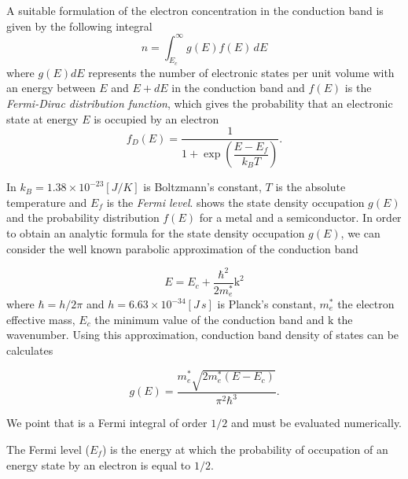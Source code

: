 A suitable formulation of the electron concentration in the conduction band is given by the following integral
\begin{equation}
\label{eq: carrier densiy integral}
n = \int_{E_c}^\infty g(E)f(E) \, dE
\end{equation}
where $g(E)dE$ represents the number of electronic states per unit volume with an energy between $E$ and $E+dE$ in the conduction band and $f(E)$ is the \textit{Fermi-Dirac distribution function}, which gives the probability that an electronic state at energy $E$ is occupied by an electron
\begin{equation}
\label{eq: fermi dirac distribution}
f_D(E) = \dfrac{1}{1+\exp\left(\dfrac{E-E_f}{k_BT}\right)} .
\end{equation}

In  $k_B=1.38\times10^{-23}[J/K]$ is Boltzmann's constant, $T$ is the absolute temperature and $E_f$ is the \textit{Fermi level}. 
 shows  the state density occupation $g(E)$ and the probability distribution $f(E)$ for a metal and a semiconductor. In order to obtain an analytic formula for the state density occupation $g(E)$, we can consider the well known parabolic approximation of the conduction band \cite{Pierret:SemiFunda}

\begin{equation}
\label{eq: approssimazione banda di conduzione}
E = E_c + \dfrac{\hbar^2}{2m_e^*}\mathrm{k}^2
\end{equation}
where $\hbar=h/2\pi$ and $h=6.63 \times 10^{-34} [J \, s]$ is Planck's constant, $m_e^*$ the electron effective mass, $E_c$ the minimum value of the conduction band and $\mathrm{k}$ the wavenumber. Using this approximation, conduction band density of states can be calculates

\begin{equation}
\label{eq: state density electron}
g(E) = \dfrac{m_e^*\sqrt{2m_e^*(E-E_c)}}{\pi^2\hbar^3}.
\end{equation}

We point that  is a Fermi integral of order $1/2$ and must be evaluated numerically.
 
\begin{Definizione}
The Fermi level ($E_f$) is the energy at which the probability of occupation of an energy state by an electron is equal to $1/2$.
\end{Definizione}


